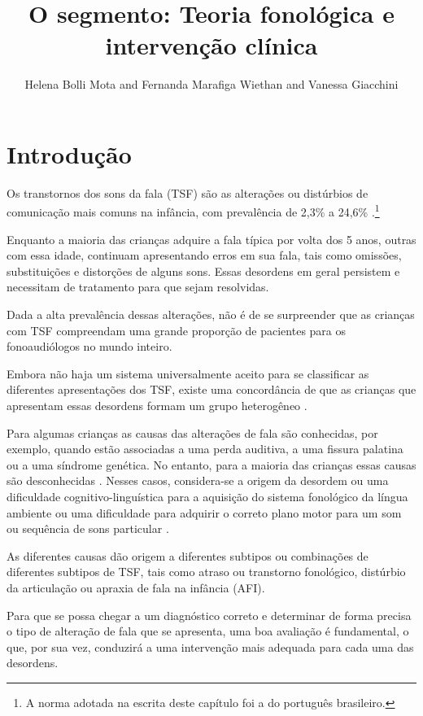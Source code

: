 \documentclass[output=paper,colorlinks,citecolor=brown,booklanguage=portuguese]{langscibook}
\title{O segmento: Teoria fonológica e intervenção clínica}
\author{Helena Bolli Mota\affiliation{Universidade Federal de Santa Maria}  and  Fernanda Marafiga Wiethan\affiliation{Universidade Federal de Santa Maria}   and   Vanessa Giacchini \affiliation{Universidade Federal do Rio Grande do Norte}}
\begin{document}
\maketitle

\section{Introdução}\label{sec:cap5sec1}

Os transtornos dos sons da fala (TSF) são as alterações ou distúrbios de comunicação mais comuns na infância, com prevalência de 2,3\% a 24,6\% \citep{Wren2016}.\footnote{A norma adotada na escrita deste capítulo foi a do português brasileiro.}

Enquanto a maioria das crianças adquire a fala típica por volta dos 5 anos, outras com essa idade, continuam apresentando erros em sua fala, tais como omissões, substituições e distorções de alguns sons. Essas desordens em geral persistem e necessitam de tratamento para que sejam resolvidas.

Dada a alta prevalência dessas alterações, não é de se surpreender que as crianças com TSF compreendam uma grande proporção de pacientes para os fonoaudiólogos no mundo inteiro.

Embora não haja um sistema universalmente aceito para se classificar as diferentes apresentações dos TSF, existe uma concordância de que as crianças que apresentam essas desordens formam um grupo heterogêneo \citep{Waring2013}.

Para algumas crianças as causas das alterações de fala são conhecidas, por exemplo, quando estão associadas a uma perda auditiva, a uma fissura palatina ou a uma síndrome genética. No entanto, para a maioria das crianças essas causas são desconhecidas \citep{Shriberg2010}. Nesses casos, considera-se a origem da desordem ou uma dificuldade cognitivo-linguística para a aquisição do sistema fonológico da língua ambiente ou uma dificuldade para adquirir o correto plano motor para um som ou sequência de sons particular \citep{Waring2013}.

As diferentes causas dão origem a diferentes subtipos ou combinações de diferentes subtipos de TSF, tais como atraso ou transtorno fonológico, distúrbio da articulação ou apraxia de fala na infância (AFI).

Para que se possa chegar a um diagnóstico correto e determinar de forma precisa o tipo de alteração de fala que se apresenta, uma boa avaliação é fundamental, o que, por sua vez, conduzirá a uma intervenção mais adequada para cada uma das desordens.
\end{document}
